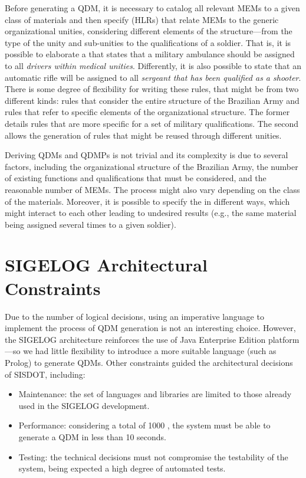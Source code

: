 Before generating a QDM, it is necessary to catalog all relevant MEMs to a given class of materials and then specify \callers (HLRs) that relate MEMs to the generic organizational unities, considering different elements of the structure---from the type of the unity and sub-unities to the qualifications of a soldier. That is, it is possible to elaborate a \shc that states that a military ambulance should be assigned to all \emph{drivers within medical unities}. Differently, it is also possible to state that an automatic rifle will be assigned to all \emph{sergeant that has been qualified as a shooter}. There is some degree of flexibility for writing these rules, that might be from two different kinds: rules that consider the entire structure of the Brazilian Army and rules that refer to specific elements of the organizational structure. The former details rules that are more specific for a set of military qualifications. The second allows the generation of rules that might be reused through different unities. 

Deriving QDMs and QDMPs is not trivial and its complexity is due to several factors, including the organizational structure of the Brazilian Army, the number of existing functions and qualifications that must be considered, and the reasonable number of MEMs. The process might also vary depending on the class of the materials. Moreover, it is possible to specify the \callers in different ways, which might interact to each other leading to undesired results (e.g., the same material being assigned several times to a given soldier). 

\section{SIGELOG Architectural Constraints}

Due to the number of logical decisions, using an imperative language to implement the process of QDM generation 
is not an interesting choice. However, the SIGELOG architecture reinforces the use of Java Enterprise Edition platform---so we had little flexibility to introduce a more suitable language (such as Prolog) to generate QDMs. Other constraints guided the architectural decisions of SISDOT, including:  

\begin{itemize}
	\item Maintenance: the set of languages and libraries are limited to those already used in the SIGELOG development.  
	\item Performance: considering a total of 1000 \callers, the system must be able to generate a QDM in less than 10 seconds.
	\item Testing: the technical decisions must not compromise the testability of the system, being expected a high degree of automated tests. 
\end{itemize}

